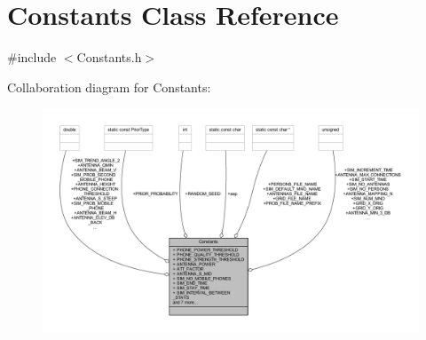 \hypertarget{class_constants}{}\section{Constants Class Reference}
\label{class_constants}


{\ttfamily \#include $<$Constants.\+h$>$}



Collaboration diagram for Constants\+:\nopagebreak
\begin{figure}[H]
\begin{center}
\leavevmode
\includegraphics[width=350pt]{class_constants__coll__graph}
\end{center}
\end{figure}
